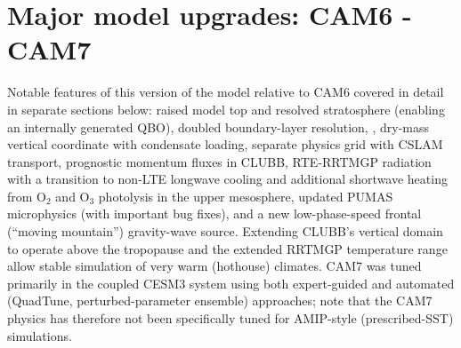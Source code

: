 \documentclass[draft]{agujournal2019}
\begin{document}
 \section{Major model upgrades: CAM6 -\> CAM7}
Notable features of this version of the model relative to CAM6 covered in detail in separate sections below: raised model top and resolved stratosphere (enabling an internally generated QBO), doubled boundary-layer resolution, {\color{blue}{switch from finite-volume to spectral-element dynamical core}}, dry-mass vertical coordinate with condensate loading, separate physics grid with CSLAM {\color{blue}{tracer}} transport, prognostic momentum fluxes in CLUBB, RTE-RRTMGP radiation with a transition to non-LTE longwave cooling \cite{fomichev1998} and additional shortwave heating from O$_2$ and O$_3$ photolysis in the upper mesosphere, updated PUMAS microphysics (with important bug fixes), and a new low-phase-speed frontal (``moving mountain'') gravity-wave source. Extending CLUBB's vertical domain to operate above the tropopause and the extended RRTMGP temperature range allow stable simulation of very warm (hothouse) climates. CAM7 was tuned primarily in the coupled CESM3 system using both expert-guided and automated (QuadTune, perturbed-parameter ensemble) approaches; note that the CAM7 physics has therefore not been specifically tuned for AMIP-style (prescribed-SST) simulations.
\end{document}
